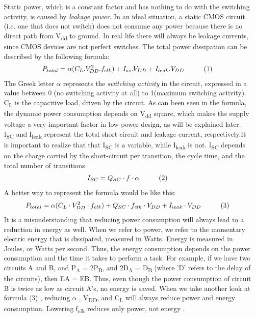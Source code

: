 Static power, which is a constant factor and has nothing to do with the switching activity, is caused by \textit{leakage power}. In an ideal situation, a static CMOS circuit (i.e. one that does not switch) does not consume any power because there is no direct path from V\textsubscript{dd} to 
ground. In real life there will always be leakage currents, since CMOS devices are not 
perfect switches. The total power dissipation can be described by the following formula:
\[P_{total} = \alpha(C_L . V_{DD}^2.f_{clk}) + I_{sc}. V_{DD} + I_{leak} . V_{DD}    \hspace{10mm} (1) \]
\vspace*{-2mm}
The Greek letter $\alpha$ represents the \textit{switching activity} in the circuit, expressed in a value between 0 (no switching activity at all) to 1(maximum switching activity). C\textsubscript{L} is the capacitive load, driven by the circuit. As can been seen in the formula, the dynamic
power consumption depends on V\textsubscript{dd} square, which makes the supply voltage a very
important factor in low-power design, as will be explained later. I\textsubscript{SC} and I\textsubscript{leak} represent
the total short circuit and leakage current, respectively.It is important to realize that
that I\textsubscript{SC} is a variable, while I\textsubscript{leak} is not. I\textsubscript{SC} depends on the charge carried by the
short-circuit per transition, the cycle time, and the total number of transitions
\vspace*{-2mm}
\[I_{SC} = Q_{SC}  \cdot  f \cdot \alpha    \hspace{10mm} (2) \] 
\vspace*{-2mm}
A better way to represent the formula would be like this:
\vspace*{-2mm}
\[P_{total} = \alpha(C_L \cdot V_{DD}^2 \cdot f_{clk}) +  Q_{SC}  \cdot  f_{clk} \cdot V_{DD} + I_{leak} \cdot V_{DD}    \hspace{10mm} (3) \]
It is a misunderstanding that reducing power consumption will always lead to a
reduction in energy as well. When we refer to power, we refer to the momentary
electric energy that is dissipated, measured in Watts. Energy is measured in Joules, or Watts per second. Thus, the energy consumption depends on the power consumption and the time it takes to perform a task. For example, if we have two circuits A and B, and P\textsubscript{A} = 2P\textsubscript{B}, and 2D\textsubscript{A} = D\textsubscript{B} (where ’D’ refers to the delay of the circuits), then EA = EB. Thus, even though the power consumption of circuit B is twice as low as circuit A’s, no energy is saved. When we take another look at formula (3) , reducing $\alpha$ , V\textsubscript{DD}, and C\textsubscript{L} will always reduce power and energy consumption. Lowering f\textsubscript{clk} reduces
only power, not energy \cite{PowerAwareArchitecting}.

